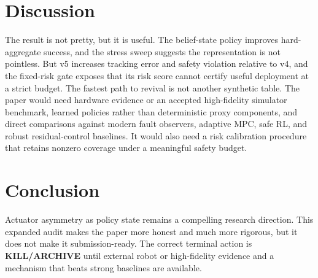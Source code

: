 \documentclass{article}
\begin{document}
\section{Discussion}
The result is not pretty, but it is useful. The belief-state policy improves hard-aggregate success, and the stress sweep suggests the representation is not pointless. But v5 increases tracking error and safety violation relative to v4, and the fixed-risk gate exposes that its risk score cannot certify useful deployment at a strict budget.
The fastest path to revival is not another synthetic table. The paper would need hardware evidence or an accepted high-fidelity simulator benchmark, learned policies rather than deterministic proxy components, and direct comparisons against modern fault observers, adaptive MPC, safe RL, and robust residual-control baselines. It would also need a risk calibration procedure that retains nonzero coverage under a meaningful safety budget.
\section{Conclusion}
Actuator asymmetry as policy state remains a compelling research direction. This expanded audit makes the paper more honest and much more rigorous, but it does not make it submission-ready. The correct terminal action is \textbf{KILL/ARCHIVE} until external robot or high-fidelity evidence and a mechanism that beats strong baselines are available.
\clearpage
\appendix
\end{document}
